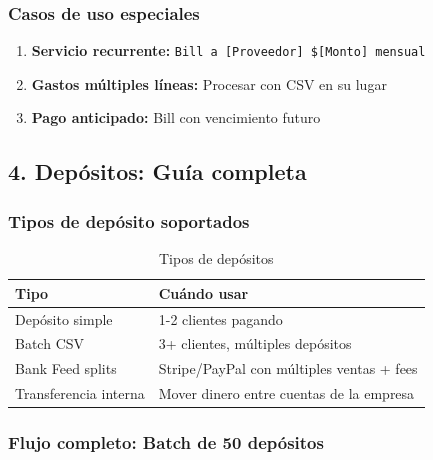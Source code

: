 \documentclass[12pt,oneside]{article}
\begin{document}
\subsubsection{Casos de uso especiales}

\begin{enumerate}
    \item \textbf{Servicio recurrente:} \texttt{Bill a [Proveedor] \$[Monto] mensual}
    \item \textbf{Gastos múltiples líneas:} Procesar con CSV en su lugar
    \item \textbf{Pago anticipado:} Bill con vencimiento futuro
\end{enumerate}

\subsection{4. Depósitos: Guía completa}

\subsubsection{Tipos de depósito soportados}

\begin{table}[h]
\centering
\begin{tabular}{|l|p{7cm}|}
\hline
\textbf{Tipo} & \textbf{Cuándo usar} \\
\hline
Depósito simple & 1-2 clientes pagando \\
\hline
Batch CSV & 3+ clientes, múltiples depósitos \\
\hline
Bank Feed splits & Stripe/PayPal con múltiples ventas + fees \\
\hline
Transferencia interna & Mover dinero entre cuentas de la empresa \\
\hline
\end{tabular}
\caption{Tipos de depósitos}
\end{table}

\subsubsection{Flujo completo: Batch de 50 depósitos}
\end{document}
